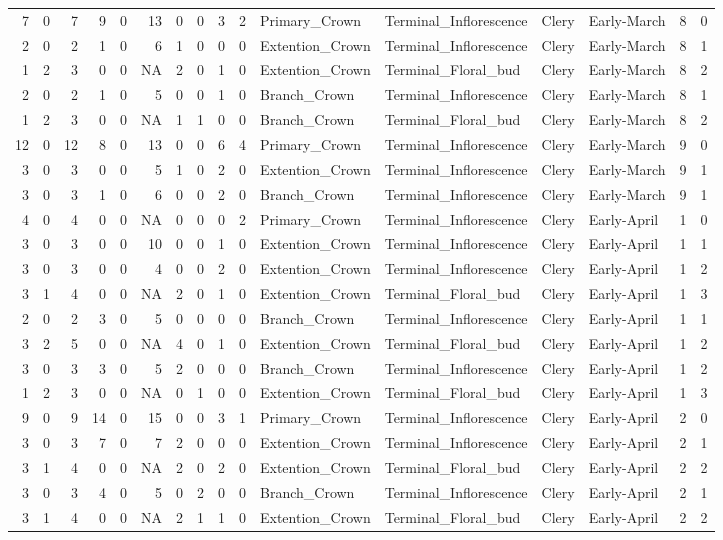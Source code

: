 \documentclass[]{article}
\begin{document}
\begin{longtable}[]{@{}rrrrrrrrrrllllrl@{}}
7 & 0 & 7 & 9 & 0 & 13 & 0 & 0 & 3 & 2 & Primary\_Crown &
Terminal\_Inflorescence & Clery & Early-March & 8 & 0\tabularnewline
2 & 0 & 2 & 1 & 0 & 6 & 1 & 0 & 0 & 0 & Extention\_Crown &
Terminal\_Inflorescence & Clery & Early-March & 8 & 1\tabularnewline
1 & 2 & 3 & 0 & 0 & NA & 2 & 0 & 1 & 0 & Extention\_Crown &
Terminal\_Floral\_bud & Clery & Early-March & 8 & 2\tabularnewline
2 & 0 & 2 & 1 & 0 & 5 & 0 & 0 & 1 & 0 & Branch\_Crown &
Terminal\_Inflorescence & Clery & Early-March & 8 & 1\tabularnewline
1 & 2 & 3 & 0 & 0 & NA & 1 & 1 & 0 & 0 & Branch\_Crown &
Terminal\_Floral\_bud & Clery & Early-March & 8 & 2\tabularnewline
12 & 0 & 12 & 8 & 0 & 13 & 0 & 0 & 6 & 4 & Primary\_Crown &
Terminal\_Inflorescence & Clery & Early-March & 9 & 0\tabularnewline
3 & 0 & 3 & 0 & 0 & 5 & 1 & 0 & 2 & 0 & Extention\_Crown &
Terminal\_Inflorescence & Clery & Early-March & 9 & 1\tabularnewline
3 & 0 & 3 & 1 & 0 & 6 & 0 & 0 & 2 & 0 & Branch\_Crown &
Terminal\_Inflorescence & Clery & Early-March & 9 & 1\tabularnewline
4 & 0 & 4 & 0 & 0 & NA & 0 & 0 & 0 & 2 & Primary\_Crown &
Terminal\_Inflorescence & Clery & Early-April & 1 & 0\tabularnewline
3 & 0 & 3 & 0 & 0 & 10 & 0 & 0 & 1 & 0 & Extention\_Crown &
Terminal\_Inflorescence & Clery & Early-April & 1 & 1\tabularnewline
3 & 0 & 3 & 0 & 0 & 4 & 0 & 0 & 2 & 0 & Extention\_Crown &
Terminal\_Inflorescence & Clery & Early-April & 1 & 2\tabularnewline
3 & 1 & 4 & 0 & 0 & NA & 2 & 0 & 1 & 0 & Extention\_Crown &
Terminal\_Floral\_bud & Clery & Early-April & 1 & 3\tabularnewline
2 & 0 & 2 & 3 & 0 & 5 & 0 & 0 & 0 & 0 & Branch\_Crown &
Terminal\_Inflorescence & Clery & Early-April & 1 & 1\tabularnewline
3 & 2 & 5 & 0 & 0 & NA & 4 & 0 & 1 & 0 & Extention\_Crown &
Terminal\_Floral\_bud & Clery & Early-April & 1 & 2\tabularnewline
3 & 0 & 3 & 3 & 0 & 5 & 2 & 0 & 0 & 0 & Branch\_Crown &
Terminal\_Inflorescence & Clery & Early-April & 1 & 2\tabularnewline
1 & 2 & 3 & 0 & 0 & NA & 0 & 1 & 0 & 0 & Extention\_Crown &
Terminal\_Floral\_bud & Clery & Early-April & 1 & 3\tabularnewline
9 & 0 & 9 & 14 & 0 & 15 & 0 & 0 & 3 & 1 & Primary\_Crown &
Terminal\_Inflorescence & Clery & Early-April & 2 & 0\tabularnewline
3 & 0 & 3 & 7 & 0 & 7 & 2 & 0 & 0 & 0 & Extention\_Crown &
Terminal\_Inflorescence & Clery & Early-April & 2 & 1\tabularnewline
3 & 1 & 4 & 0 & 0 & NA & 2 & 0 & 2 & 0 & Extention\_Crown &
Terminal\_Floral\_bud & Clery & Early-April & 2 & 2\tabularnewline
3 & 0 & 3 & 4 & 0 & 5 & 0 & 2 & 0 & 0 & Branch\_Crown &
Terminal\_Inflorescence & Clery & Early-April & 2 & 1\tabularnewline
3 & 1 & 4 & 0 & 0 & NA & 2 & 1 & 1 & 0 & Extention\_Crown &
Terminal\_Floral\_bud & Clery & Early-April & 2 & 2\tabularnewline

\end{longtable}
\end{document}
